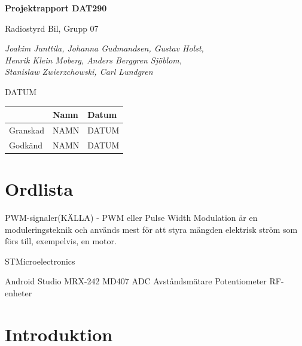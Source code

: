 \documentclass[a4paper]{article}
\begin{document}
\begin{titlepage}
\centering
{\bfseries\huge Projektrapport DAT290}

\vspace{10mm}

{\Large Radiostyrd Bil, Grupp 07}

\vspace{20mm}

{\Large \itshape{Joakim Junttila, Johanna Gudmandsen, Gustav Holst,\\Henrik Klein Moberg, Anders Berggren Sjöblom, \\[1mm] Stanislaw Zwierzchowski, Carl Lundgren}}

\vspace{10mm}

{DATUM}


\normalsize{
\begin{table}[b]
\centering
\begin{tabular}{|l|l|l|}  \hline
         & \bf Namn & \bf Datum   \\ \hline \hline
Granskad & NAMN     & DATUM        \\ \hline
Godkänd  & NAMN     & DATUM         \\ \hline
 \end{tabular} 
 \end{table}}
\end{titlepage}

\tableofcontents

\newpage
\section{Ordlista}
PWM-signaler(KÄLLA) - PWM eller Pulse Width Modulation är en moduleringsteknik och används mest för att styra mängden elektrisk ström som förs till, exempelvis, en motor.

STMicroelectronics

Android Studio
MRX-242
MD407
ADC
Avståndsmätare
Potentiometer
RF-enheter


\newpage
\section{Introduktion}
\end{document}
